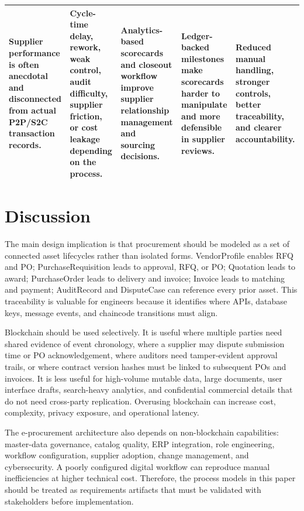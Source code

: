 \documentclass[conference]{IEEEtran}
\begin{document}
\begin{table}[t]
\begin{tabularx}{\textwidth}{|Y|Y|Y|Y|Y|}
Supplier performance is often anecdotal and disconnected from actual P2P/S2C transaction records. & Cycle-time delay, rework, weak control, audit difficulty, supplier friction, or cost leakage depending on the process. & Analytics-based scorecards and closeout workflow improve supplier relationship management and sourcing decisions. & Ledger-backed milestones make scorecards harder to manipulate and more defensible in supplier reviews. & Reduced manual handling, stronger controls, better traceability, and clearer accountability. \\ \hline
\end{tabularx}
\end{table}

\section{Discussion}
The main design implication is that procurement should be modeled as a set of connected asset lifecycles rather than isolated forms. VendorProfile enables RFQ and PO; PurchaseRequisition leads to approval, RFQ, or PO; Quotation leads to award; PurchaseOrder leads to delivery and invoice; Invoice leads to matching and payment; AuditRecord and DisputeCase can reference every prior asset. This traceability is valuable for engineers because it identifies where APIs, database keys, message events, and chaincode transitions must align.

Blockchain should be used selectively. It is useful where multiple parties need shared evidence of event chronology, where a supplier may dispute submission time or PO acknowledgement, where auditors need tamper-evident approval trails, or where contract version hashes must be linked to subsequent POs and invoices. It is less useful for high-volume mutable data, large documents, user interface drafts, search-heavy analytics, and confidential commercial details that do not need cross-party replication. Overusing blockchain can increase cost, complexity, privacy exposure, and operational latency.

The e-procurement architecture also depends on non-blockchain capabilities: master-data governance, catalog quality, ERP integration, role engineering, workflow configuration, supplier adoption, change management, and cybersecurity. A poorly configured digital workflow can reproduce manual inefficiencies at higher technical cost. Therefore, the process models in this paper should be treated as requirements artifacts that must be validated with stakeholders before implementation.
\end{document}
